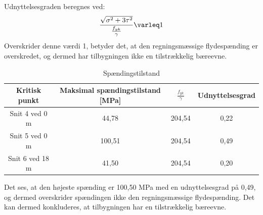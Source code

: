 Udnyttelsesgraden beregnes ved:
\begin{equation}
	\frac{\sqrt{\sigma^2 + 3\tau^2}}{\frac{f_{yk}}{\gamma}} \varleq 1
\end{equation}
Overskrider denne værdi 1, betyder det, at den regningsmæssige flydespænding er overskredet, og dermed har tilbygningen ikke en tilstrækkelig bæreevne. 

\begin{table} [H]
	\begin{center}
		\begin{tabular}{c c c c }
			\hline
			Kritisk punkt   & Maksimal spændingstilstand [MPa] & $\frac{f_{yk}}{\gamma}$ & Udnyttelsesgrad \\ \hline
			Snit 4 ved 0 m  & 44,78                   & 204,54      & 0,22     \\ \hline
			Snit 5 ved 0 m  & 100,51                  & 204,54      & 0,49     \\ \hline
			Snit 6 ved 18 m & 41,50                   & 204,54      & 0,20     \\ \hline
		\end{tabular}
		\caption{Spændingstilstand}
		\label{tab:tilstand}
	\end{center}
\end{table}

Det ses, at den højeste spænding er 100,50 MPa med en udnyttelsesgrad på 0,49, og dermed overskrider spændingen ikke den regningsmæssige flydespænding. Det kan dermed konkluderes, at tilbygningen har en tilstrækkelig bæreevne. 